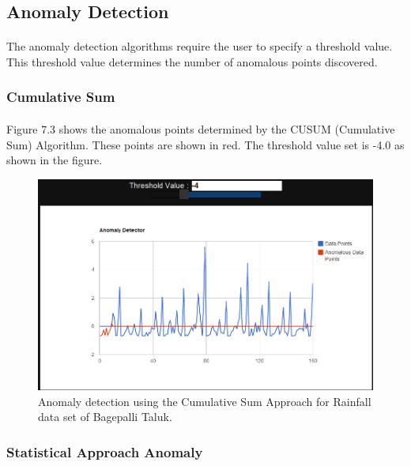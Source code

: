 \documentclass[12pt,a4paper]{report}
\begin{document}
\subsection{Anomaly Detection}
\paragraph{} The anomaly detection algorithms require the user to specify a threshold value. This threshold value  determines the number of anomalous points discovered.
\subsubsection{Cumulative Sum}
\paragraph{} Figure 7.3 shows the anomalous points determined by the CUSUM (Cumulative Sum) Algorithm. These points are shown in red. The threshold value set is -4.0 as shown in the figure.
\begin{figure}[h!]

  \centering
    \includegraphics[scale=0.5]{./screenshots/result_ano_cusum_Bag.png}
  \caption{Anomaly detection using the Cumulative Sum Approach for Rainfall data set of Bagepalli Taluk.}
\end{figure}

\subsubsection{Statistical Approach Anomaly}
\end{document}
